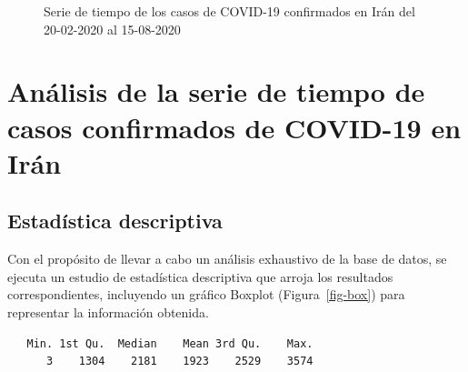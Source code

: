 \documentclass[
  letterpaper,
  DIV=11,
  numbers=noendperiod]{scrreport}
\theoremstyle{plain}
\theoremstyle{definition}
\theoremstyle{definition}
\theoremstyle{plain}
\theoremstyle{remark}
\begin{document}
\begin{figure}


\caption{\label{fig-ts}Serie de tiempo de los casos de COVID-19
confirmados en Irán del 20-02-2020 al 15-08-2020}

\end{figure}%

\section{Análisis de la serie de tiempo de casos confirmados de COVID-19
en
Irán}\label{anuxe1lisis-de-la-serie-de-tiempo-de-casos-confirmados-de-covid-19-en-iruxe1n}

\subsection{Estadística descriptiva}\label{estaduxedstica-descriptiva}

Con el propósito de llevar a cabo un análisis exhaustivo de la base de
datos, se ejecuta un estudio de estadística descriptiva que arroja los
resultados correspondientes, incluyendo un gráfico Boxplot
(Figura~\ref{fig-box}) para representar la información obtenida.

\begin{verbatim}
   Min. 1st Qu.  Median    Mean 3rd Qu.    Max. 
      3    1304    2181    1923    2529    3574 
\end{verbatim}
\end{document}
